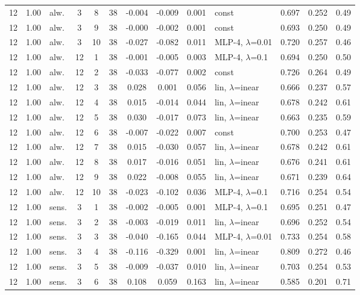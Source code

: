 \begin{scriptsize}
\begin{longtable}{cclcc c ccc l ccc}
12 & 1.00 & alw. & 3 & 8 & 38 & -0.004 & -0.009 & 0.001 & const & 0.697 & 0.252 & 0.49 \\
12 & 1.00 & alw. & 3 & 9 & 38 & -0.000 & -0.002 & 0.001 & const & 0.693 & 0.250 & 0.49 \\
12 & 1.00 & alw. & 3 & 10 & 38 & -0.027 & -0.082 & 0.011 & MLP-4, $\lambda$=0.01 & 0.720 & 0.257 & 0.46 \\
12 & 1.00 & alw. & 12 & 1 & 38 & -0.001 & -0.005 & 0.003 & MLP-4, $\lambda$=0.1 & 0.694 & 0.250 & 0.50 \\
12 & 1.00 & alw. & 12 & 2 & 38 & -0.033 & -0.077 & 0.002 & const & 0.726 & 0.264 & 0.49 \\
12 & 1.00 & alw. & 12 & 3 & 38 & 0.028 & 0.001 & 0.056 & lin, $\lambda$=inear & 0.666 & 0.237 & 0.57 \\
12 & 1.00 & alw. & 12 & 4 & 38 & 0.015 & -0.014 & 0.044 & lin, $\lambda$=inear & 0.678 & 0.242 & 0.61 \\
12 & 1.00 & alw. & 12 & 5 & 38 & 0.030 & -0.017 & 0.073 & lin, $\lambda$=inear & 0.663 & 0.235 & 0.59 \\
12 & 1.00 & alw. & 12 & 6 & 38 & -0.007 & -0.022 & 0.007 & const & 0.700 & 0.253 & 0.47 \\
12 & 1.00 & alw. & 12 & 7 & 38 & 0.015 & -0.030 & 0.057 & lin, $\lambda$=inear & 0.678 & 0.242 & 0.61 \\
12 & 1.00 & alw. & 12 & 8 & 38 & 0.017 & -0.016 & 0.051 & lin, $\lambda$=inear & 0.676 & 0.241 & 0.61 \\
12 & 1.00 & alw. & 12 & 9 & 38 & 0.022 & -0.008 & 0.055 & lin, $\lambda$=inear & 0.671 & 0.239 & 0.64 \\
12 & 1.00 & alw. & 12 & 10 & 38 & -0.023 & -0.102 & 0.036 & MLP-4, $\lambda$=0.1 & 0.716 & 0.254 & 0.54 \\
12 & 1.00 & sens. & 3 & 1 & 38 & -0.002 & -0.005 & 0.001 & MLP-4, $\lambda$=0.1 & 0.695 & 0.251 & 0.47 \\
12 & 1.00 & sens. & 3 & 2 & 38 & -0.003 & -0.019 & 0.011 & lin, $\lambda$=inear & 0.696 & 0.252 & 0.54 \\
12 & 1.00 & sens. & 3 & 3 & 38 & -0.040 & -0.165 & 0.044 & MLP-4, $\lambda$=0.01 & 0.733 & 0.254 & 0.58 \\
12 & 1.00 & sens. & 3 & 4 & 38 & -0.116 & -0.329 & 0.001 & lin, $\lambda$=inear & 0.809 & 0.272 & 0.46 \\
12 & 1.00 & sens. & 3 & 5 & 38 & -0.009 & -0.037 & 0.010 & lin, $\lambda$=inear & 0.703 & 0.254 & 0.53 \\
12 & 1.00 & sens. & 3 & 6 & 38 & 0.108 & 0.059 & 0.163 & lin, $\lambda$=inear & 0.585 & 0.201 & 0.71 \\

\end{longtable}
\end{scriptsize}
